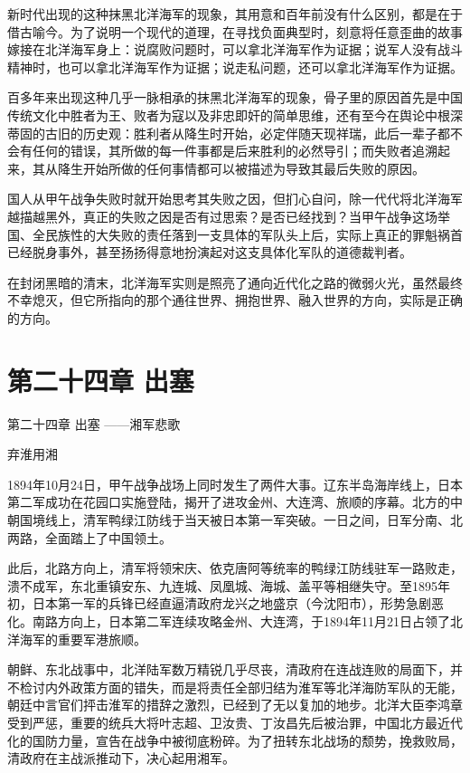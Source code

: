 \documentclass[12pt,UTF8]{ctexbook}
\begin{document}
新时代出现的这种抹黑北洋海军的现象，其用意和百年前没有什么区别，都是在于借古喻今。为了说明一个现代的道理，在寻找负面典型时，刻意将任意歪曲的故事嫁接在北洋海军身上：说腐败问题时，可以拿北洋海军作为证据；说军人没有战斗精神时，也可以拿北洋海军作为证据；说走私问题，还可以拿北洋海军作为证据。

百多年来出现这种几乎一脉相承的抹黑北洋海军的现象，骨子里的原因首先是中国传统文化中胜者为王、败者为寇以及非忠即奸的简单思维，还有至今在舆论中根深蒂固的古旧的历史观：胜利者从降生时开始，必定伴随天现祥瑞，此后一辈子都不会有任何的错误，其所做的每一件事都是后来胜利的必然导引；而失败者追溯起来，其从降生开始所做的任何事情都可以被描述为导致其最后失败的原因。

国人从甲午战争失败时就开始思考其失败之因，但扪心自问，除一代代将北洋海军越描越黑外，真正的失败之因是否有过思索？是否已经找到？当甲午战争这场举国、全民族性的大失败的责任落到一支具体的军队头上后，实际上真正的罪魁祸首已经脱身事外，甚至扬扬得意地扮演起对这支具体化军队的道德裁判者。

在封闭黑暗的清末，北洋海军实则是照亮了通向近代化之路的微弱火光，虽然最终不幸熄灭，但它所指向的那个通往世界、拥抱世界、融入世界的方向，实际是正确的方向。

\chapter{第二十四章 出塞}

第二十四章
出塞
——湘军悲歌

弃淮用湘

1894年10月24日，甲午战争战场上同时发生了两件大事。辽东半岛海岸线上，日本第二军成功在花园口实施登陆，揭开了进攻金州、大连湾、旅顺的序幕。北方的中朝国境线上，清军鸭绿江防线于当天被日本第一军突破。一日之间，日军分南、北两路，全面踏上了中国领土。

此后，北路方向上，清军将领宋庆、依克唐阿等统率的鸭绿江防线驻军一路败走，溃不成军，东北重镇安东、九连城、凤凰城、海城、盖平等相继失守。至1895年初，日本第一军的兵锋已经直逼清政府龙兴之地盛京（今沈阳市），形势急剧恶化。南路方向上，日本第二军连续攻略金州、大连湾，于1894年11月21日占领了北洋海军的重要军港旅顺。

朝鲜、东北战事中，北洋陆军数万精锐几乎尽丧，清政府在连战连败的局面下，并不检讨内外政策方面的错失，而是将责任全部归结为淮军等北洋海防军队的无能，朝廷中言官们抨击淮军的措辞之激烈，已经到了无以复加的地步。北洋大臣李鸿章受到严惩，重要的统兵大将叶志超、卫汝贵、丁汝昌先后被治罪，中国北方最近代化的国防力量，宣告在战争中被彻底粉碎。为了扭转东北战场的颓势，挽救败局，清政府在主战派推动下，决心起用湘军。
\end{document}
